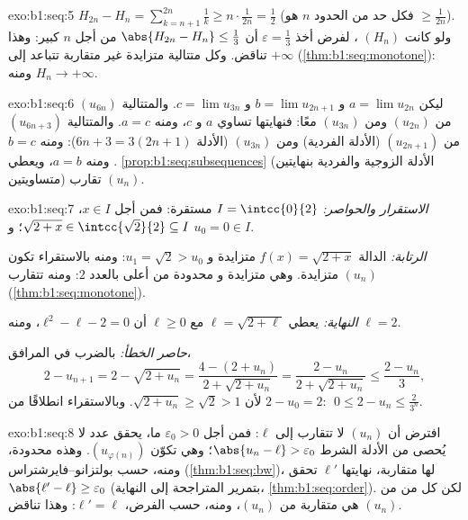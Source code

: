 \begin{solution}{exo:b1:seq:5}
$H_{2n} - H_n = \sum_{k=n+1}^{2n} \frac 1k \geq n \cdot
\frac{1}{2n} = \frac12$ (فكل حد من الحدود $n$ هو $\geq
\frac{1}{2n}$). ولو كانت $(H_n)$ ، لفرض أخذ $\varepsilon =
\frac13$ أن $\abs{H_{2n} - H_n} \leq \frac13$ من أجل $n$
كبير: وهذا تناقض. وكل متتالية متزايدة غير متقاربة تتباعد إلى
$+\infty$ (\cref{thm:b1:seq:monotone}): ومنه $H_n \to +\infty$.
\end{solution}

\begin{solution}{exo:b1:seq:6}
ليكن $a = \lim u_{2n}$ و $b = \lim u_{2n+1}$ و $c = \lim u_{3n}$. والمتتالية
$(u_{6n})$  من $(u_{2n})$ ومن
$(u_{3n})$ معًا: فنهايتها تساوي $a$ و $c$، ومنه $a = c$. والمتتالية
$(u_{6n+3})$  من $(u_{2n+1})$ (الأدلة الفردية) ومن
$(u_{3n})$ (الأدلة $6n + 3 = 3(2n+1)$): ومنه $b = c$. ومنه $a = b$،
ويعطي \cref{prop:b1:seq:subsequences} (الأدلة الزوجية والفردية بنهايتين
متساويتين) تقارب $(u_n)$.
\end{solution}

\begin{solution}{exo:b1:seq:7}
\emph{الاستقرار والحواصر:}  $I = \intcc{0}{2}$ مستقرة: فمن أجل $x \in
I$، $\sqrt{2 + x} \in \intcc{\sqrt 2}{2} \subseteq I$؛ و $u_0 = 0
\in I$.

\emph{الرتابة:} الدالة $f(x) = \sqrt{2+x}$ متزايدة و $u_1 =
\sqrt 2 > u_0$: ومنه بالاستقراء تكون $(u_n)$ متزايدة. وهي متزايدة و
محدودة من أعلى بالعدد $2$: ومنه تتقارب
(\cref{thm:b1:seq:monotone}).

\emph{النهاية:} يعطي $\ell = \sqrt{2 + \ell}$ مع $\ell \geq 0$ أن
$\ell^2 - \ell - 2 = 0$، ومنه $\ell = 2$.

\emph{حاصر الخطأ:} بالضرب في المرافق،
\[
2 - u_{n+1} = 2 - \sqrt{2 + u_n}
= \frac{4 - (2 + u_n)}{2 + \sqrt{2+u_n}}
= \frac{2 - u_n}{2 + \sqrt{2 + u_n}}
\leq \frac{2 - u_n}{3},
\]
لأن $\sqrt{2 + u_n} \geq \sqrt 2 > 1$. وبالاستقراء انطلاقًا من $2 - u_0
= 2$: $\;0 \leq 2 - u_n \leq \frac{2}{3^n}$.
\end{solution}

\begin{solution}{exo:b1:seq:8}
افترض أن $(u_n)$ لا تتقارب إلى $\ell$: فمن أجل $\varepsilon_0
> 0$ ما، يحقق عدد لا يُحصى من الأدلة الشرط $\abs{u_n - \ell} >
\varepsilon_0$؛ وهي تكوّن  $(u_{\varphi(n)})$. وهذه
 محدودة، ومنه، حسب بولتزانو--فايرشتراس
(\cref{thm:b1:seq:bw})، لها  متقاربة، نهايتها
$\ell'$ تحقق $\abs{\ell' - \ell} \geq \varepsilon_0$
(بتمرير المتراجحة إلى النهاية، \cref{thm:b1:seq:order}). لكن
كل  من  من $(u_n)$ هي  متقاربة من $(u_n)$،
ومنه، حسب الفرض، $\ell' = \ell$: وهذا تناقض.
\end{solution}

